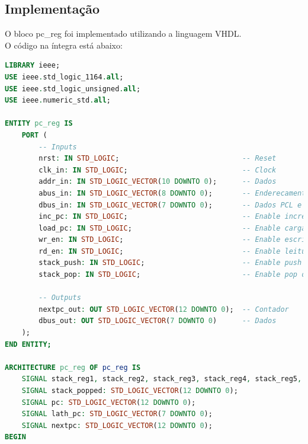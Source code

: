 \documentclass{article}
\begin{document}
\subsection{Implementação}

O bloco pc\_reg foi implementado utilizando a linguagem VHDL.\\

O código na íntegra está abaixo:\\

\begin{lstlisting}[language=VHDL, caption={Código VHDL pc\_reg}]
LIBRARY ieee;
USE ieee.std_logic_1164.all;
USE ieee.std_logic_unsigned.all;
USE ieee.numeric_std.all;

ENTITY pc_reg IS
    PORT (
        -- Inputs
        nrst: IN STD_LOGIC;                             -- Reset
        clk_in: IN STD_LOGIC;                           -- Clock
        addr_in: IN STD_LOGIC_VECTOR(10 DOWNTO 0);      -- Dados
        abus_in: IN STD_LOGIC_VECTOR(8 DOWNTO 0);       -- Enderecamento PCL e PCLATH
        dbus_in: IN STD_LOGIC_VECTOR(7 DOWNTO 0);       -- Dados PCL e PCLATH
        inc_pc: IN STD_LOGIC;                           -- Enable incremento.
        load_pc: IN STD_LOGIC;                          -- Enable carga.
        wr_en: IN STD_LOGIC;                            -- Enable escrita.
        rd_en: IN STD_LOGIC;                            -- Enable leitura.
        stack_push: IN STD_LOGIC;                       -- Enable push op
        stack_pop: IN STD_LOGIC;                        -- Enable pop op

        -- Outputs
        nextpc_out: OUT STD_LOGIC_VECTOR(12 DOWNTO 0);  -- Contador
        dbus_out: OUT STD_LOGIC_VECTOR(7 DOWNTO 0)      -- Dados
    );
END ENTITY;

ARCHITECTURE pc_reg OF pc_reg IS
    SIGNAL stack_reg1, stack_reg2, stack_reg3, stack_reg4, stack_reg5, stack_reg6, stack_reg7, stack_reg8 : STD_LOGIC_VECTOR(12 DOWNTO 0);
    SIGNAL stack_popped: STD_LOGIC_VECTOR(12 DOWNTO 0);
    SIGNAL pc: STD_LOGIC_VECTOR(12 DOWNTO 0);
    SIGNAL lath_pc: STD_LOGIC_VECTOR(7 DOWNTO 0);
    SIGNAL nextpc: STD_LOGIC_VECTOR(12 DOWNTO 0);
BEGIN


\end{lstlisting}
\end{document}
